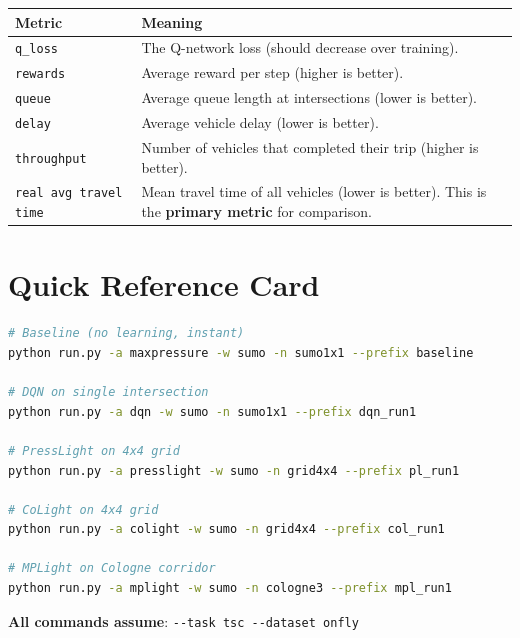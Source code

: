 \documentclass[11pt,a4paper]{article}
\begin{document}
\begin{center}
\begin{longtable}{lp{9cm}}
\toprule
\textbf{Metric} & \textbf{Meaning} \\
\midrule
\endhead
\texttt{q\_loss}        & The Q-network loss (should decrease over training). \\
\texttt{rewards}        & Average reward per step (higher is better). \\
\texttt{queue}          & Average queue length at intersections (lower is better). \\
\texttt{delay}          & Average vehicle delay (lower is better). \\
\texttt{throughput}     & Number of vehicles that completed their trip (higher is better). \\
\texttt{real avg travel time} & Mean travel time of all vehicles (lower is better). This is the \textbf{primary metric} for comparison. \\
\bottomrule
\end{longtable}
\end{center}

\section{Quick Reference Card}

\begin{tcolorbox}[colback=gray!5!white, colframe=gray!75!black, title=\textbf{Cheat Sheet}]
\begin{lstlisting}[language=bash]
# Baseline (no learning, instant)
python run.py -a maxpressure -w sumo -n sumo1x1 --prefix baseline

# DQN on single intersection
python run.py -a dqn -w sumo -n sumo1x1 --prefix dqn_run1

# PressLight on 4x4 grid
python run.py -a presslight -w sumo -n grid4x4 --prefix pl_run1

# CoLight on 4x4 grid
python run.py -a colight -w sumo -n grid4x4 --prefix col_run1

# MPLight on Cologne corridor
python run.py -a mplight -w sumo -n cologne3 --prefix mpl_run1
\end{lstlisting}
\textbf{All commands assume}: \texttt{-{}-task tsc -{}-dataset onfly}
\end{tcolorbox}
\end{document}
